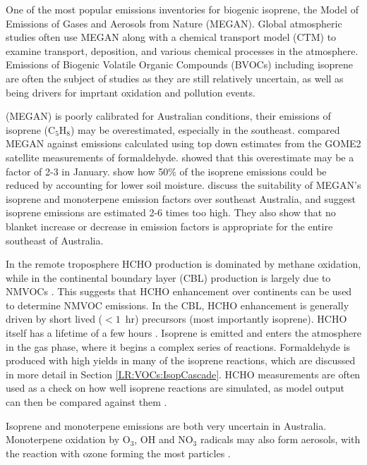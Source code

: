   One of the most popular emissions inventories for biogenic isoprene, the Model of Emissions of Gases and Aerosols from Nature (MEGAN).
  Global atmospheric studies often use MEGAN along with a chemical transport model (CTM) to examine transport, deposition, and various chemical processes in the atmosphere.
  Emissions of Biogenic Volatile Organic Compounds (BVOCs) including isoprene are often the subject of studies as they are still relatively uncertain, as well as being drivers for imprtant oxidation and pollution events.
  
  (MEGAN) is poorly calibrated for Australian conditions, their emissions of isoprene (C$_5$H$_8$) may be overestimated, especially in the southeast.
  \textcite{Muller2008} compared MEGAN against emissions calculated using top down estimates from the GOME2 satellite measurements of formaldehyde.
  \textcite{Stavrakou2015} showed that this overestimate may be a factor of 2-3 in January.
  \textcite{Sindelarova2014} show how 50\% of the isoprene emissions could be reduced by accounting for lower soil moisture.
  \textcite{Emmerson2016} discuss the suitability of MEGAN's isoprene and monoterpene emission factors over southeast Australia, and suggest isoprene emissions are estimated 2-6 times too high.
  They also show that no blanket increase or decrease in emission factors is appropriate for the entire southeast of Australia.
  
  In the remote troposphere HCHO production is dominated by methane oxidation, while in the continental boundary layer (CBL) production is largely due to NMVOCs \parencite{Abbot2003, Kefauver2014}.
  This suggests that HCHO enhancement over continents can be used to determine NMVOC emissions.
  In the CBL, HCHO enhancement is generally driven by short lived ($<1$~hr) precursors (most importantly isoprene).
  HCHO itself has a lifetime of a few hours \parencite{Kefauver2014}.
  Isoprene is emitted and enters the atmosphere in the gas phase, where it begins a complex series of reactions.
  Formaldehyde is produced with high yields in many of the isoprene reactions, which are discussed in more detail in Section \ref{LR:VOCs:IsopCascade}.
  HCHO measurements are often used as a check on how well isoprene reactions are simulated, as model output can then be compared against them \parencite{Marvin2017}.
  
  
  
  Isoprene and monoterpene emissions are both very uncertain in Australia.
  Monoterpene oxidation by O$_3$, OH and NO$_3$ radicals may also form aerosols, with the reaction with ozone forming the most particles \parencite{Kanakidou2005}.
  
